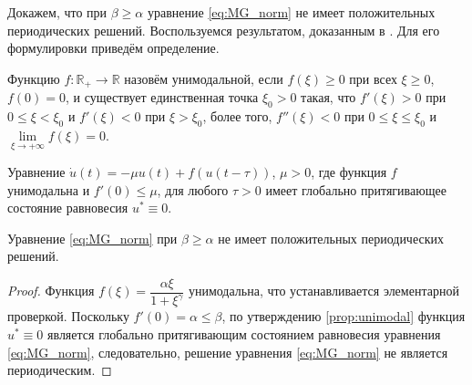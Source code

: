 Докажем, что при $\beta \geq \alpha$ уравнение \eqref{eq:MG_norm} не имеет положительных периодических решений. Воспользуемся результатом, доказанным в \cite[Proposition 3.1]{Roest2007}. Для его формулировки приведём определение.

\begin{definition}
	Функцию $f: \mathbb{R}_{+} \to \mathbb{R}$ назовём унимодальной, если $f(\xi) \geq 0$ при всех $\xi \geq 0$, $f(0) = 0$, и существует единственная точка $\xi_0 > 0$ такая, что $f'(\xi) > 0$ при $0 \leq \xi < \xi_0$ и $f'(\xi) < 0$ при $\xi > \xi_0$, более того, $f''(\xi) < 0$ при $0 \leq \xi \leq \xi_0$ и $\lim\limits_{\xi \to +\infty} f(\xi) = 0$.
\end{definition}

\begin{proposition}
	\label{prop:unimodal}
	\cite{Roest2007} Уравнение $\dot{u}(t) = -\mu u(t) + f(u(t - \tau))$, $\mu > 0$, где функция $f$ унимодальна и $f'(0) \leq \mu$, для любого $\tau > 0$ имеет глобально притягивающее состояние равновесия $u^* \equiv 0$.
\end{proposition}
	
\begin{proposition}
	Уравнение \eqref{eq:MG_norm} при $\beta \geq \alpha$ не имеет положительных периодических решений.
\end{proposition}
\begin{proof}
	Функция $f(\xi) = \dfrac{\alpha \xi}{1 + \xi^{\gamma}}$ унимодальна, что устанавливается элементарной проверкой. Поскольку $f'(0) = \alpha \leq \beta$, по утверждению \eqref{prop:unimodal} функция $u^* \equiv 0$ является глобально притягивающим состоянием равновесия уравнения \eqref{eq:MG_norm}, следовательно, решение уравнения \eqref{eq:MG_norm} не является периодическим.
\end{proof}

